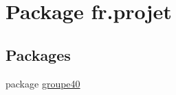 \hypertarget{namespacefr_1_1projet}{}\section{Package fr.\+projet}
\label{namespacefr_1_1projet}
\subsection*{Packages}
\begin{DoxyCompactItemize}
\item 
package \hyperlink{namespacefr_1_1projet_1_1groupe40}{groupe40}
\end{DoxyCompactItemize}

